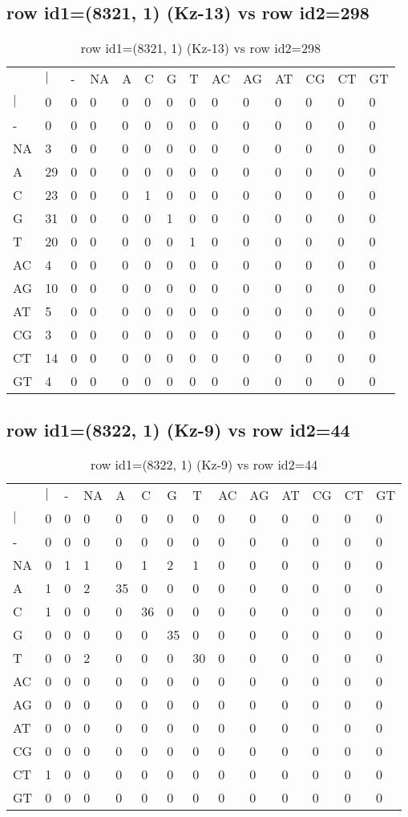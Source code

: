\subsection{row id1=(8321, 1) (Kz-13) vs row id2=298}
\begin{center}
\begin{longtable}{|l|l|l|l|l|l|l|l|l|l|l|l|l|l|}
\caption{row id1=(8321, 1) (Kz-13) vs row id2=298} \label{table_dm510}\\
\hline
\\
\hline
&$|$&-&NA&A&C&G&T&AC&AG&AT&CG&CT&GT\\
$|$&0&0&0&0&0&0&0&0&0&0&0&0&0\\
-&0&0&0&0&0&0&0&0&0&0&0&0&0\\
NA&3&0&0&0&0&0&0&0&0&0&0&0&0\\
A&29&0&0&0&0&0&0&0&0&0&0&0&0\\
C&23&0&0&0&1&0&0&0&0&0&0&0&0\\
G&31&0&0&0&0&1&0&0&0&0&0&0&0\\
T&20&0&0&0&0&0&1&0&0&0&0&0&0\\
AC&4&0&0&0&0&0&0&0&0&0&0&0&0\\
AG&10&0&0&0&0&0&0&0&0&0&0&0&0\\
AT&5&0&0&0&0&0&0&0&0&0&0&0&0\\
CG&3&0&0&0&0&0&0&0&0&0&0&0&0\\
CT&14&0&0&0&0&0&0&0&0&0&0&0&0\\
GT&4&0&0&0&0&0&0&0&0&0&0&0&0\\
\hline
\end{longtable}
\end{center}

\subsection{row id1=(8322, 1) (Kz-9) vs row id2=44}
\begin{center}
\begin{longtable}{|l|l|l|l|l|l|l|l|l|l|l|l|l|l|}
\caption{row id1=(8322, 1) (Kz-9) vs row id2=44} \label{table_dm512}\\
\hline
\\
\hline
&$|$&-&NA&A&C&G&T&AC&AG&AT&CG&CT&GT\\
$|$&0&0&0&0&0&0&0&0&0&0&0&0&0\\
-&0&0&0&0&0&0&0&0&0&0&0&0&0\\
NA&0&1&1&0&1&2&1&0&0&0&0&0&0\\
A&1&0&2&35&0&0&0&0&0&0&0&0&0\\
C&1&0&0&0&36&0&0&0&0&0&0&0&0\\
G&0&0&0&0&0&35&0&0&0&0&0&0&0\\
T&0&0&2&0&0&0&30&0&0&0&0&0&0\\
AC&0&0&0&0&0&0&0&0&0&0&0&0&0\\
AG&0&0&0&0&0&0&0&0&0&0&0&0&0\\
AT&0&0&0&0&0&0&0&0&0&0&0&0&0\\
CG&0&0&0&0&0&0&0&0&0&0&0&0&0\\
CT&1&0&0&0&0&0&0&0&0&0&0&0&0\\
GT&0&0&0&0&0&0&0&0&0&0&0&0&0\\
\hline
\end{longtable}
\end{center}

